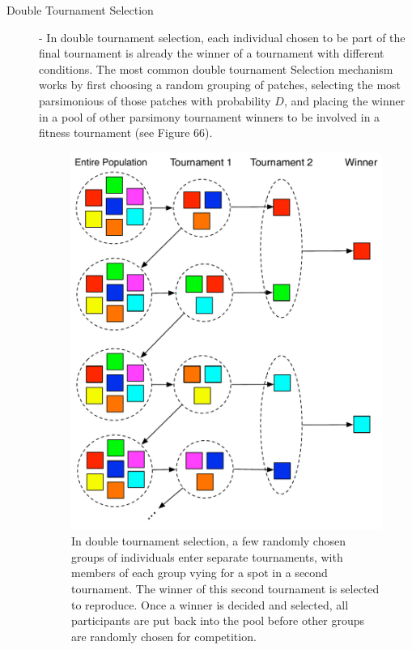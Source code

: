 \documentclass[12pt]{report} 	%
\numberwithin{figure}{chapter}
\numberwithin{table}{chapter}
\numberwithin{equation}{chapter}
\begin{document}
\begin{flushleft}
\begin{description}
\item [Double Tournament Selection] - In double tournament selection, each individual chosen to be part of the final tournament is already the winner of a tournament with different conditions. The most common double tournament Selection mechanism works by first choosing a random grouping of patches, selecting the most parsimonious of those patches with probability $D$, and placing the winner in a pool of other parsimony tournament winners to be involved in a fitness tournament (see Figure 66).
\\
\vspace{12pt}
\begin{figure}[h!]
\begin{center}
\includegraphics[scale = 0.7]{DoubleTournamentSelection}
\caption[Double tournament selection]{In double tournament selection, a few randomly chosen groups of individuals enter separate tournaments, with members of each group vying for a spot in a second tournament. The winner of this second tournament is selected to reproduce. Once a winner is decided and selected, all participants are put back into the pool before other groups are randomly chosen for competition.}
\end{center}
\vspace{6pt}
\end{figure}


\end{description}
\end{flushleft}
\end{document}
